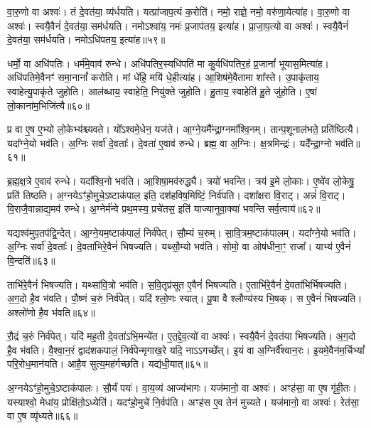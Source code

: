 वा॒रु॒णो वा अश्वः॑।
तं दे॒वत॑या॒ व्य॑र्धयति।
यत्प्रा॑जाप॒त्यं क॒रोति॑।
नमो॒ राज्ञे॒ नमो॒ वरु॑णा॒येत्या॑ह।
वा॒रु॒णो वा अश्वः॑।
स्वयै॒वैनं॑ दे॒वत॑या॒ सम॑र्धयति।
नमोऽश्वा॑य॒ नमः॑ प्र॒जा\-प॑तय॒ इत्या॑ह।
प्रा॒जा॒प॒त्यो वा अश्वः॑।
स्वयै॒वैनं॑ दे॒वत॑या॒ सम॑र्धयति।
नमोऽधि॑पतय॒ इत्या॑ह॥५९॥\ip

धर्मो॒ वा अधि॑पतिः।
धर्म॑मे॒वाव॑ रुन्धे।
अधि॑पतिर॒स्यधि॑पतिं मा कु॒र्वधि॑पतिर॒हं प्र॒जानां᳚ भूयास॒मित्या॑ह।
अधि॑पतिमे॒वैनꣳ॑ समा॒नानां᳚ करोति।
मां धे॑हि॒ मयि॑ धे॒हीत्या॑ह।
आ॒शिष॑\-मे॒वैतामा शा᳚स्ते।
उ॒पाकृ॑ताय॒ स्वाहेत्यु॒पाकृ॑ते जुहोति।
आल॑ब्धाय॒ स्वाहेति॒ नियु॑क्ते जुहोति।
हु॒ताय॒ स्वाहेति॑ हु॒ते जु॑होति।
ए॒षां लो॒काना॑म॒भिजि॑त्यै॥६०॥\ip

प्र वा ए॒ष ए॒भ्यो लो॒केभ्य॑श्च्यवते।
यो᳚ऽश्वमे॒धेन॒ यज॑ते।
आ॒ग्ने॒यमै᳚न्द्रा॒ग्नमा᳚श्वि॒नम्।
तान्प॒शूनाल॑भते॒ प्रति॑\-ष्ठित्यै।
यदा᳚ग्ने॒यो भव॑ति।
अ॒ग्निः सर्वा॑ दे॒वताः᳚।
दे॒वता॑ ए॒वाव॑ रुन्धे।
ब्रह्म॒ वा अ॒ग्निः।
क्ष॒त्रमिन्द्रः॑।
यदै᳚न्द्रा॒ग्नो भव॑ति॥६१॥\ip

ब्र॒ह्म॒क्ष॒त्रे ए॒वाव॑ रुन्धे।
यदा᳚श्वि॒नो भव॑ति।
आ॒शिषा॒मव॑रुद्ध्यै।
त्रयो॑ भवन्ति।
त्रय॑ इ॒मे लो॒काः।
ए॒ष्वे॑व लो॒केषु॒ प्रति॑ तिष्ठति।
अ॒ग्नये\-ऽꣳ॑हो॒मुचे॒\-ऽष्टा\-क॑पाल॒ इति॒ दश॑हविष॒मिष्टिं॒ निर्व॑पति।
दशा᳚क्षरा वि॒राट्।
अन्नं॑ वि॒राट्।
वि॒राजै॒वान्नाद्य॒मव॑ रुन्धे।
अ॒ग्नेर्म॑न्वे प्रथ॒मस्य॒ प्रचे॑तस॒ इति॑ याज्यानुवा॒क्या॑ भवन्ति सर्व॒त्वाय॑॥६२॥\ip\anuvakamend[अधि॑पतय॒ इत्या॑हा॒भि॑जित्या ऐन्द्रा॒ग्नो भव॑ति रुन्ध॒ एकं॑ च]

यद्यश्व॑मुप॒तप॑द्वि॒न्देत्।
आ॒ग्ने॒यम॒ष्टा\-क॑पालं॒ निर्व॑पेत्।
सौ॒म्यं च॒रुम्।
सा॒वि॒त्रम॒ष्टा\-क॑पालम्।
यदा᳚ग्ने॒यो भव॑ति।
अ॒ग्निः सर्वा॑ दे॒वताः᳚।
दे॒वता॑भिरे॒वैनं॑ भिषज्यति।
यथ्सौ॒म्यो भव॑ति।
सोमो॒ वा ओष॑धीना॒ꣳ॒ राजा᳚।
याभ्य॑ ए॒वैनं॑ वि॒न्दति॑॥६३॥\ip

ताभि॑रे॒वैनं॑ भिषज्यति।
यथ्सा॑वि॒त्रो भव॑ति।
स॒वि॒तृप्र॑सूत ए॒वैनं॑ भिषज्यति।
ए॒ताभि॑रे॒वैनं॑ दे॒वता॑भिर्भिषज्यति।
अ॒ग॒दो है॒व भ॑वति।
पौ॒ष्णं च॒रुं निर्व॑पेत्।
यदि॑ श्लो॒णः स्यात्।
पू॒षा वै श्लौण्य॑स्य भि॒षक्।
स ए॒वैनं॑ भिषज्यति।
अश्लो॑णो है॒व भ॑वति॥६४॥\ip

रौ॒द्रं च॒रुं निर्व॑पेत्।
यदि॑ मह॒ती दे॒वता॑\-ऽभि॒मन्ये॑त।
ए॒त॒द्दे॒व॒त्यो॑ वा अश्वः॑।
स्वयै॒वैनं॑ दे॒वत॑या भिषज्यति।
अ॒ग॒दो है॒व भ॑वति।
वै॒श्वा॒न॒रं द्वाद॑शकपालं॒ निर्व॑पेन्मृगाख॒रे यदि॒ नाऽऽगच्छे᳚त्।
इ॒यं वा अ॒ग्निर्वै᳚श्वान॒रः।
इ॒यमे॒वैन॑म॒र्चिभ्यां᳚ परि॒रोध॒मान॑यति।
आहै॒व सुत्य॒मह॑र्गच्छति।
यद्य॑धी॒यात्॥६५॥\ip

अ॒ग्नये\-ऽꣳ॑हो॒मुचे॒\-ऽष्टा\-क॑पालः।
सौ॒र्यं पयः॑।
वा॒य॒व्य॑ आज्य॑भागः।
यज॑मानो॒ वा अश्वः॑।
अꣳह॑सा॒ वा ए॒ष गृ॑ही॒तः।
यस्याश्वो॒ मेधा॑य॒ प्रोक्षि॑तो॒\-ऽध्येति॑।
यदꣳ॑हो॒मुचे॑ नि॒र्वप॑ति।
अꣳह॑स ए॒व तेन॑ मुच्यते।
यज॑मानो॒ वा अश्वः॑।
रेत॑सा॒ वा ए॒ष व्यृ॑ध्यते॥६६॥\ip

